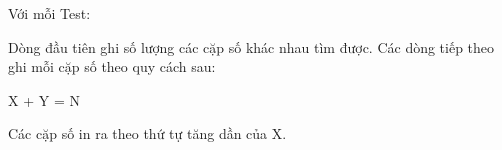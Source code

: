 Với mỗi Test:  

   Dòng đầu tiên ghi số lượng các cặp số khác nhau tìm được.  Các dòng tiếp theo ghi mỗi cặp số theo quy cách sau:  

   X + Y = N  

   Các cặp số in ra theo thứ tự tăng dần của X.